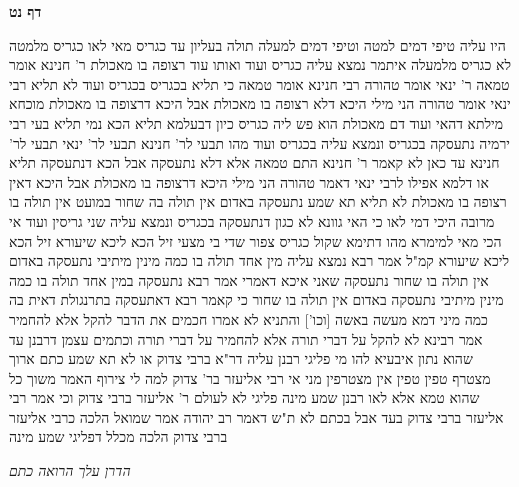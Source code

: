 \documentclass[12pt, openany]{book}
\newcommand{\sethebfont}{
\fontsize{10.5pt}{21.0pt} \selectfont
}
\newcommand{\twocol}[1]{
	{\sethebfont \begin{multicols}{2}
			#1
	\end{multicols}}	
}
\newcommand{\sectname}{}
\newcommand{\newsection}[1]{
	\addcontentsline{toc}{section}{#1}
	\renewcommand{\sectname}{#1}	
	\vspace{-\baselineskip}
	\begin{center}
		\textbf{%
\fontsize{16pt}{16pt}\selectfont
			#1}
	\end{center}
	\vspace{-\baselineskip}
	\nopagebreak
}
\begin{document}
\newsection{דף נט}
\twocol{היו עליה טיפי דמים למטה וטיפי דמים למעלה תולה בעליון עד כגריס  מאי לאו כגריס מלמטה  לא כגריס מלמעלה 
איתמר נמצא עליה כגריס ועוד ואותו עוד רצופה בו מאכולת ר' חנינא אומר  טמאה  ר' ינאי אומר  טהורה  רבי חנינא אומר  טמאה כי תליא בכגריס בכגריס ועוד לא תליא 
רבי ינאי אומר  טהורה הני מילי היכא דלא רצופה בו מאכולת אבל היכא דרצופה בו מאכולת מוכחא מילתא דהאי ועוד דם מאכולת הוא  פש ליה כגריס כיון דבעלמא תליא הכא נמי תליא 
בעי רבי ירמיה  נתעסקה בכגריס ונמצא עליה בכגריס ועוד מהו  תבעי לר' חנינא תבעי לר' ינאי 
תבעי לר' חנינא עד כאן לא קאמר ר' חנינא התם טמאה אלא דלא נתעסקה אבל הכא דנתעסקה תליא  או דלמא  אפילו לרבי ינאי דאמר טהורה הני מילי היכא דרצופה בו מאכולת אבל היכא דאין רצופה בו מאכולת לא תליא 
תא שמע  נתעסקה באדום אין תולה בה שחור במועט אין תולה בו מרובה  היכי דמי  לאו כי האי גוונא 
לא כגון דנתעסקה בכגריס ונמצא עליה שני גריסין ועוד  אי הכי מאי למימרא 
מהו דתימא  שקול כגריס צפור שדי בי מצעי זיל הכא ליכא שיעורא זיל הכא ליכא שיעורא קמ"ל 
אמר רבא  נמצא עליה מין אחד תולה בו כמה מינין  מיתיבי  נתעסקה באדום אין תולה בו שחור  נתעסקה שאני 
איכא דאמרי אמר רבא  נתעסקה במין אחד תולה בו כמה מינין  מיתיבי  נתעסקה באדום אין תולה בו שחור  כי קאמר רבא דאתעסקה בתרנגולת דאית בה כמה מיני דמא
מעשה באשה [וכו'] והתניא  לא אמרו חכמים את הדבר להקל אלא להחמיר 
אמר רבינא  לא להקל על דברי תורה אלא להחמיר על דברי תורה וכתמים עצמן דרבנן
עד שהוא נתון איבעיא להו  מי פליגי רבנן עליה דר"א ברבי צדוק או לא 
תא שמע  כתם ארוך מצטרף טפין טפין אין מצטרפין  מני  אי רבי אליעזר בר' צדוק למה לי צירוף  האמר  משוך כל שהוא טמא 
אלא לאו רבנן שמע מינה  פליגי  לא לעולם ר' אליעזר ברבי צדוק וכי אמר רבי אליעזר ברבי צדוק בעד אבל בכתם לא 
ת"ש דאמר רב יהודה אמר שמואל  הלכה כרבי אליעזר ברבי צדוק  הלכה מכלל דפליגי שמע מינה
\par \par {\large\emph{הדרן עלך הרואה כתם}}\par \par }
\end{document}
